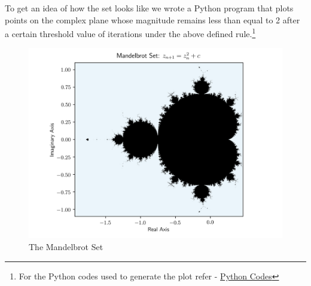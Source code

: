 \documentclass[14pts]{article}
\begin{document}
    To get an idea of how the set looks like we wrote a Python program that plots points on the complex plane whose magnitude remains less than equal to 2 after a certain threshold value of iterations under the above defined rule.\footnote[2]{For the Python codes used to generate the plot refer - \href{https://github.com/atharvaaalok/AS2101_Mandelbrot_Lorenz/tree/main/Python}{Python Codes}}
    \bigskip

    
    \begin{figure}[!h]
        \centering
        \includegraphics[width = \textwidth]{Images/Mandelbrot_set.png}
        \caption{The Mandelbrot Set}
        \label{fig:Mandelbrot}
    \end{figure}
\end{document}
